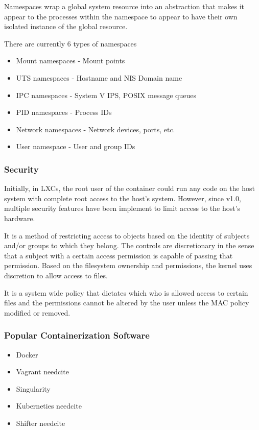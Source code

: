 \documentclass[american]{article}
\newcounter{subsubsubsection}[subsubsection]
\newcommand{\needcite}{
	\gls{needcite}
}
\begin{document}
Namespaces wrap a global system resource into an abstraction that makes it appear to the processes within the namespace to appear to have their own isolated instance of the global resource\cite{namespaces}.

There are currently 6 types of namespaces\cite{namespaces}
\begin{itemize}
	\item Mount namespaces - Mount points
	\item UTS namespaces - Hostname and NIS Domain name
	\item IPC namespaces - System V IPS, POSIX message queues
	\item PID namespaces - Process IDs
	\item Network namespaces - Network devices, ports, etc.
	\item User namespace - User and group IDs
\end{itemize}

\subsubsection{Security}

Initially, in LXCs, the root user of the container could run any code on the host system with complete root access to the host's system. However, since v1.0, multiple security features have been implement to limit access to the host's hardware\cite{lxc-wiki}.

It is a method of restricting access to objects based on the identity of subjects and/or groups to which they belong. The controls are discretionary in the sense that a subject with a certain access permission is capable of passing that permission. Based on the filesystem ownership and permissions, the kernel uses discretion to allow access to files\cite{dac}.

It is a system wide policy that dictates which who is allowed access to certain files and the permissions cannot be altered by the user unless the MAC policy modified or removed.

\subsubsection{Popular Containerization Software}

\begin{itemize}
\item Docker \cite{Docker}
\item Vagrant \needcite
\item Singularity \cite{Singularity}
\item Kuberneties \needcite
\item Shifter \needcite
\end{itemize}
\end{document}

